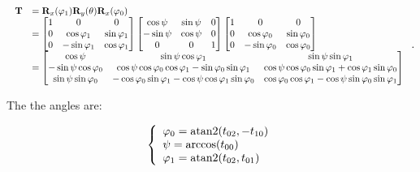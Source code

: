     \begin{equation}
        \scalebox{0.85}{
            $ \begin{array}{ll}
                \mathbf{T}
                &= \mathbf{R}_{x}(\varphi_1)\mathbf{R}_{y}(\theta)\mathbf{R}_{x}(\varphi_0) \\
                &=
                \begin{bmatrix}
                    1 & 0 & 0 \\
                    0 & \cos \varphi_1 & \sin \varphi_1 \\
                    0 & -\sin \varphi_1 & \cos \varphi_1
                \end{bmatrix}
                \begin{bmatrix}
                    \cos \psi & \sin \psi & 0 \\
                    -\sin \psi & \cos \psi & 0 \\
                    0 & 0 & 1
                \end{bmatrix}
                \begin{bmatrix}
                    1 & 0 & 0 \\
                    0 & \cos \varphi_0 & \sin \varphi_0 \\
                    0 & -\sin \varphi_0 & \cos \varphi_0
                \end{bmatrix} \\
                &=
                \begin{bmatrix}
                    \cos \psi
                    &  \sin \psi \cos \varphi_1
                    & \sin \psi \sin \varphi_1 \\
                    -\sin \psi \cos \varphi_0
                    & \cos \psi \cos \varphi_0 \cos \varphi_1 - \sin \varphi_0 \sin \varphi_1
                    & \cos \psi \cos \varphi_0 \sin \varphi_1 + \cos \varphi_1 \sin \varphi_0 \\
                    \sin \psi \sin \varphi_0
                    & -\cos \varphi_0 \sin \varphi_1 - \cos \psi \cos \varphi_1 \sin \varphi_0
                    & \cos \varphi_0 \cos \varphi_1 - \cos \psi \sin \varphi_0 \sin \varphi_1
                \end{bmatrix}
            \end{array} $
        }
    .\end{equation}

    The the angles are:

    \begin{equation}
        \left\{ \begin{array}{l}
            \varphi_0 = \operatorname{atan2}(t_{02}, -t_{10}) \\
            \psi = \arccos(t_{00}) \\
            \varphi_1 = \operatorname{atan2}(t_{02}, t_{01})
        \end{array} \right.
    \end{equation}

